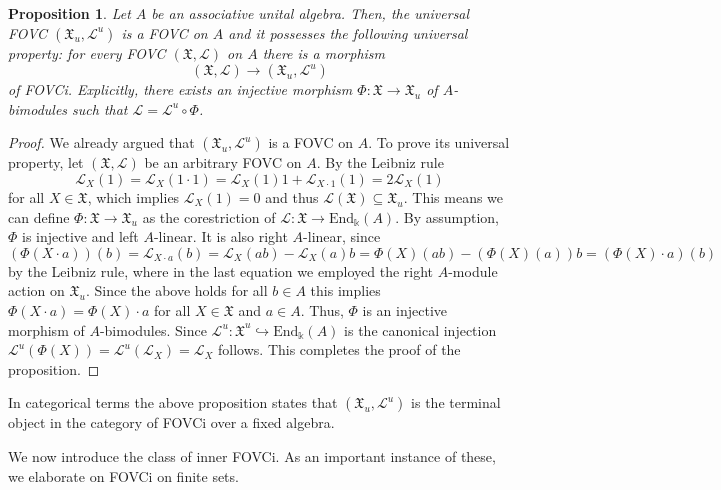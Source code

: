 \documentclass{article}
\newtheorem{proposition}[thm]{Proposition}
\theoremstyle{definition}
\begin{document}
	\begin{proposition}\label{prop:univ}
		Let $A$ be an associative unital algebra.
		Then, the universal FOVC $(\mathfrak{X}_u,\mathscr{L}^u)$ is a FOVC on $A$ and it possesses the following universal property:
		for every FOVC $(\mathfrak{X},\mathscr{L})$ on $A$ there is a morphism 
		$$
		(\mathfrak{X},\mathscr{L})\to(\mathfrak{X}_u,\mathscr{L}^u)
		$$
		of FOVCi. Explicitly, there exists an injective morphism $\Phi\colon\mathfrak{X}\to\mathfrak{X}_u$ of $A$-bimodules such that $\mathscr{L}=\mathscr{L}^u\circ\Phi$.
	\end{proposition}
	\begin{proof}
		We already argued that $(\mathfrak{X}_u,\mathscr{L}^u)$ is a FOVC on $A$. To prove its universal property,
		let $(\mathfrak{X},\mathscr{L})$ be an arbitrary FOVC on $A$. By the Leibniz rule 
		$$
		\mathscr{L}_X(1)
		=\mathscr{L}_X(1\cdot 1)
		=\mathscr{L}_X(1)1+\mathscr{L}_{X\cdot 1}(1)
		=2\mathscr{L}_X(1)
		$$
		for all $X\in\mathfrak{X}$, which implies $\mathscr{L}_X(1)=0$ and thus $\mathscr{L}(\mathfrak{X})\subseteq\mathfrak{X}_u$. This means we can define $\Phi\colon\mathfrak{X}\to\mathfrak{X}_u$ as the corestriction of $\mathscr{L}\colon\mathfrak{X}\to\mathrm{End}_\Bbbk(A)$. By assumption, $\Phi$ is injective and left $A$-linear. It is also right $A$-linear, since
		$$
		(\Phi(X\cdot a))(b)
		=\mathscr{L}_{X\cdot a}(b)
		=\mathscr{L}_X(ab)-\mathscr{L}_X(a)b
		=\Phi(X)(ab)-(\Phi(X)(a))b
		=(\Phi(X)\cdot a)(b)
		$$
		by the Leibniz rule, where in the last equation we employed the right $A$-module action on $\mathfrak{X}_u$. Since the above holds for all $b\in A$ this implies $\Phi(X\cdot a)=\Phi(X)\cdot a$ for all $X\in\mathfrak{X}$ and $a\in A$. Thus, $\Phi$ is an injective morphism of $A$-bimodules. Since $\mathscr{L}^u\colon\mathfrak{X}^u\hookrightarrow\mathrm{End}_\Bbbk(A)$ is the canonical injection $\mathscr{L}^u(\Phi(X))=\mathscr{L}^u(\mathscr{L}_X)
		=\mathscr{L}_X$ follows. This completes the proof of the proposition.
	\end{proof}
	In categorical terms the above proposition states that $(\mathfrak{X}_u,\mathscr{L}^u)$ is the terminal object in the category of FOVCi over a fixed algebra.
	
	\medskip
	
	We now introduce the class of inner FOVCi. As an important instance of these, we elaborate on FOVCi on finite sets.
	
\end{document}
